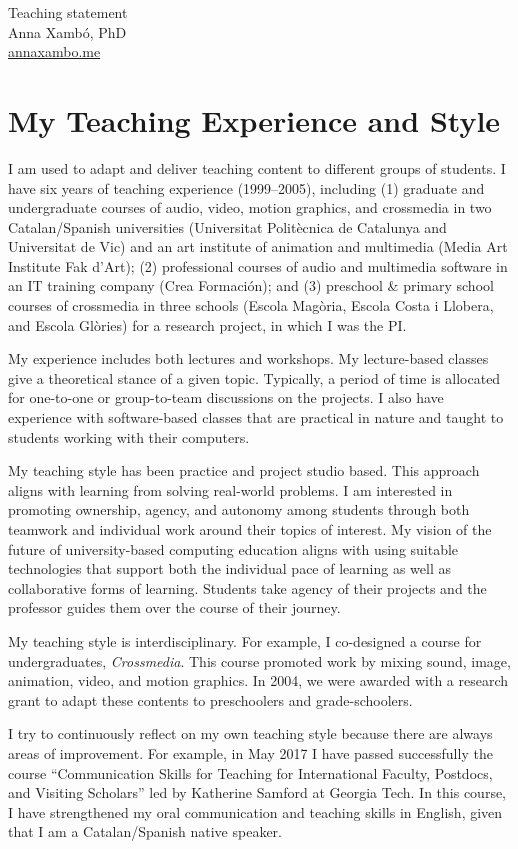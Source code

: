 \documentclass[10pt, a4paper]{article}
\begin{document}
{\LARGE Teaching statement}\\[0.2cm]
Anna Xambó, PhD\\
\href{http://annaxambo.me}{annaxambo.me}

\section*{My Teaching Experience and Style}

I am used to adapt and deliver teaching content to different groups of students. I have six years of teaching experience (1999--2005), including (1) graduate and undergraduate courses of audio, video, motion graphics, and crossmedia in two Catalan/Spanish universities (Universitat Politècnica de Catalunya and Universitat de Vic) and an art institute of animation and multimedia (Media Art Institute Fak d’Art); (2) professional courses of audio and multimedia software in an IT training company (Crea Formación); and (3) preschool \& primary school courses of crossmedia in three schools (Escola Magòria, Escola Costa i Llobera, and Escola Glòries) for a research project, in which I was the PI. 

My experience includes both lectures and workshops. My lecture-based classes give a theoretical stance of a given topic. Typically, a period of time is allocated for one-to-one or group-to-team discussions on the projects. I also have experience with software-based classes that are practical in nature and taught to students working with their computers. 

My teaching style has been practice and project studio based. This approach aligns with learning from solving real-world problems. I am interested in promoting ownership, agency, and autonomy among students through both teamwork and individual work around their topics of interest. My vision of the future of university-based computing education aligns with using suitable technologies that support both the individual pace of learning as well as collaborative forms of learning. Students take agency of their projects and the professor guides them over the course of their journey. 

My teaching style is interdisciplinary. For example, I co-designed a course for undergraduates, \emph{Crossmedia}. This course promoted work by mixing sound, image, animation, video, and motion graphics. In 2004, we were awarded with a research grant to adapt these contents to preschoolers and grade-schoolers.

I try to continuously reflect on my own teaching style because there are always areas of improvement. For example, in May 2017 I have passed successfully the course ``Communication Skills for Teaching for International Faculty, Postdocs, and Visiting Scholars'' led by Katherine Samford at Georgia Tech. In this course, I have strengthened my oral communication and teaching skills in English, given that I am a Catalan/Spanish native speaker. 
\end{document}
